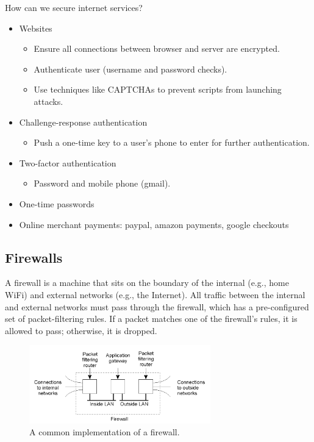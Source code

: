 \documentclass[twoside]{article}
\begin{document}
How can we secure internet services?

\begin{itemize}
\item Websites

\begin{itemize}
\item Ensure all connections between browser and server are encrypted.
\item Authenticate user (username and password checks).
\item Use techniques like CAPTCHAs to prevent scripts from launching attacks.
\end{itemize}

\item Challenge-response authentication

\begin{itemize}
\item Push a one-time key to a user's phone to enter for further authentication.
\end{itemize}

\item Two-factor authentication

\begin{itemize}
\item Password and mobile phone (gmail).
\end{itemize}

\item One-time passwords
\item Online merchant payments: paypal, amazon payments, google checkouts

\end{itemize}

\subsection{Firewalls}

A firewall is a machine that sits on the boundary of the internal (e.g., home WiFi) and external networks (e.g., the Internet). All traffic between the internal and external networks must pass through the firewall, which has a pre-configured set of packet-filtering rules. If a packet matches one of the firewall's rules, it is allowed to pass; otherwise, it is dropped. 

\begin{figure}[H]
\centering
\includegraphics[width=0.7\textwidth]{firewall.png}
\caption{A common implementation of a firewall.}
\end{figure}
\end{document}
